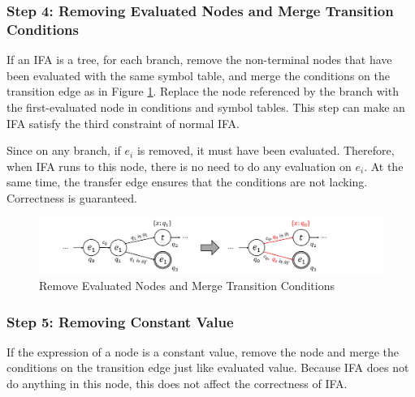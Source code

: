 \subsubsection*{Step 4: Removing Evaluated Nodes and Merge Transition Conditions}

If an IFA is a tree, for each branch, remove the non-terminal nodes that have been evaluated with the same symbol table, and merge the conditions on the transition edge as in Figure \ref{fig:nmlifa-merge}. Replace the node referenced by the branch with the first-evaluated node in conditions and symbol tables. This step can make an IFA satisfy the third constraint of normal IFA.

Since on any branch, if $e_i$ is removed, it must have been evaluated. Therefore, when IFA runs to this node, there is no need to do any evaluation on $e_i$. At the same time, the transfer edge ensures that the conditions are not lacking. Correctness is guaranteed.

\begin{figure}[t]
    \centering
    \includegraphics[scale=0.25]{images/nmlifa/nmlifa-merge.png}
    \caption{Remove Evaluated Nodes and Merge Transition Conditions}
    \label{fig:nmlifa-merge}
\end{figure}

\subsubsection*{Step 5: Removing Constant Value}

If the expression of a node is a constant value, remove the node and merge the conditions on the transition edge just like evaluated value. Because IFA does not do anything in this node, this does not affect the correctness of IFA.



